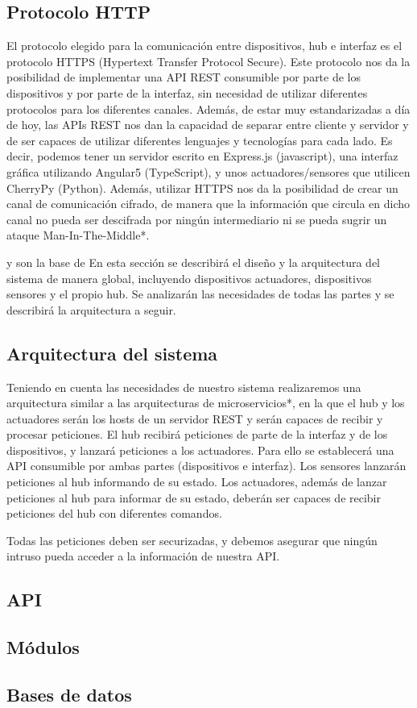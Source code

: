 \subsection{Protocolo HTTP}
El protocolo elegido para la comunicación entre dispositivos, hub e interfaz es el protocolo HTTPS (Hypertext Transfer Protocol Secure).
\newline
Este protocolo nos da la posibilidad de implementar una API REST consumible por parte de los dispositivos y por parte de la interfaz,
sin necesidad de utilizar diferentes protocolos para los diferentes canales. 
\newline
Además, de estar muy estandarizadas a día de hoy, las APIs REST nos dan la capacidad de separar entre cliente y servidor y de ser capaces
de utilizar diferentes lenguajes y tecnologías para cada lado. Es decir, podemos tener un servidor escrito en Express.js (javascript), una interfaz 
gráfica utilizando Angular5 (TypeScript), y unos actuadores/sensores que utilicen CherryPy (Python).
\newline
Además, utilizar HTTPS nos da la posibilidad de crear un canal de comunicación cifrado, de manera que la información que circula en dicho 
canal no pueda ser descifrada por ningún intermediario ni se pueda sugrir un ataque Man-In-The-Middle*.

y son la base de 
En esta sección se describirá el diseño y la arquitectura del sistema de manera global, incluyendo dispositivos actuadores, 
dispositivos sensores y el propio hub. Se analizarán las necesidades de todas las partes y se describirá la arquitectura a seguir.
\subsection{Arquitectura del sistema}
Teniendo en cuenta las necesidades de nuestro sistema realizaremos una arquitectura similar a las arquitecturas de microservicios*,
en la que el hub y los actuadores serán los hosts de un servidor REST y serán capaces de recibir y procesar peticiones.
\newline
El hub recibirá peticiones de parte de la interfaz y de los dispositivos, y lanzará peticiones a los actuadores. Para ello se establecerá una API consumible por ambas partes (dispositivos e interfaz).
Los sensores lanzarán peticiones al hub informando de su estado.
Los actuadores, además de lanzar peticiones al hub para informar de su estado, deberán ser capaces de recibir peticiones del hub con
diferentes comandos.

Todas las peticiones deben ser securizadas, y debemos asegurar que ningún intruso pueda acceder a la información de nuestra API.

\subsection{API}

\subsection{Módulos}
\subsection{Bases de datos}

